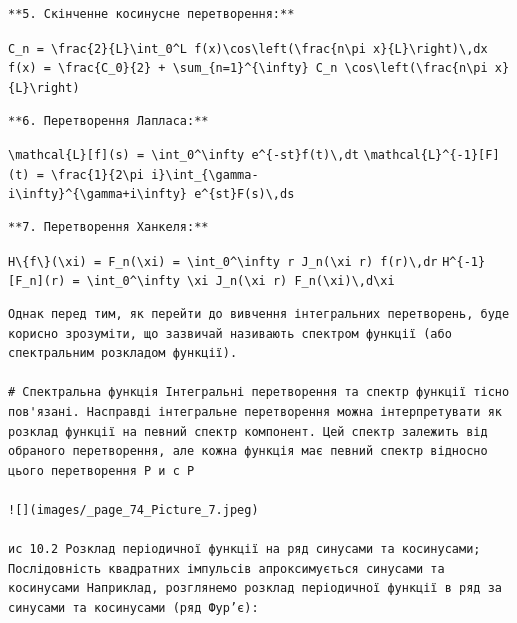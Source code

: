 \documentclass[
  ukrainian,
]{article}
\begin{document}
\begin{verbatim}
**5. Скінченне косинусне перетворення:**
\end{verbatim}

\texttt{C\_n\ =\ \textbackslash{}frac\{2\}\{L\}\textbackslash{}int\_0\^{}L\ f(x)\textbackslash{}cos\textbackslash{}left(\textbackslash{}frac\{n\textbackslash{}pi\ x\}\{L\}\textbackslash{}right)\textbackslash{},dx}
\texttt{f(x)\ =\ \textbackslash{}frac\{C\_0\}\{2\}\ +\ \textbackslash{}sum\_\{n=1\}\^{}\{\textbackslash{}infty\}\ C\_n\ \textbackslash{}cos\textbackslash{}left(\textbackslash{}frac\{n\textbackslash{}pi\ x\}\{L\}\textbackslash{}right)}

\begin{verbatim}
**6. Перетворення Лапласа:**
\end{verbatim}

\texttt{\textbackslash{}mathcal\{L\}{[}f{]}(s)\ =\ \textbackslash{}int\_0\^{}\textbackslash{}infty\ e\^{}\{-st\}f(t)\textbackslash{},dt}
\texttt{\textbackslash{}mathcal\{L\}\^{}\{-1\}{[}F{]}(t)\ =\ \textbackslash{}frac\{1\}\{2\textbackslash{}pi\ i\}\textbackslash{}int\_\{\textbackslash{}gamma-i\textbackslash{}infty\}\^{}\{\textbackslash{}gamma+i\textbackslash{}infty\}\ e\^{}\{st\}F(s)\textbackslash{},ds}

\begin{verbatim}
**7. Перетворення Ханкеля:**
\end{verbatim}

\texttt{H\textbackslash{}\{f\textbackslash{}\}(\textbackslash{}xi)\ =\ F\_n(\textbackslash{}xi)\ =\ \textbackslash{}int\_0\^{}\textbackslash{}infty\ r\ J\_n(\textbackslash{}xi\ r)\ f(r)\textbackslash{},dr}
\texttt{H\^{}\{-1\}{[}F\_n{]}(r)\ =\ \textbackslash{}int\_0\^{}\textbackslash{}infty\ \textbackslash{}xi\ J\_n(\textbackslash{}xi\ r)\ F\_n(\textbackslash{}xi)\textbackslash{},d\textbackslash{}xi}

\begin{verbatim}
Однак перед тим, як перейти до вивчення інтегральних перетворень, буде корисно зрозуміти, що зазвичай називають спектром функції (або спектральним розкладом функції).

# Спектральна функція Інтегральні перетворення та спектр функції тісно пов'язані. Насправді інтегральне перетворення можна інтерпретувати як розклад функції на певний спектр компонент. Цей спектр залежить від обраного перетворення, але кожна функція має певний спектр відносно цього перетворення Р и с Р

![](images/_page_74_Picture_7.jpeg)

ис 10.2 Розклад періодичної функції на ряд синусами та косинусами; Послідовність квадратних імпульсів апроксимується синусами та косинусами Наприклад, розглянемо розклад періодичної функції в ряд за синусами та косинусами (ряд Фур’є):
\end{verbatim}
\end{document}
